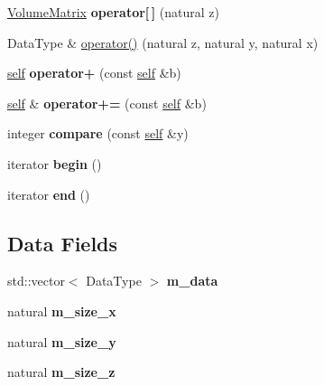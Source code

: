 \begin{DoxyCompactItemize}
\hyperlink{classez_1_1maths_1_1Volume_1_1VolumeMatrix}{Volume\+Matrix} {\bfseries operator\mbox{[}$\,$\mbox{]}} (natural z)
\item 
Data\+Type \& \hyperlink{classez_1_1maths_1_1Volume_af6447dfa426fd0fd36ab680f72b9475f}{operator()} (natural z, natural y, natural x)
\item 
\mbox{\label{classez_1_1maths_1_1Volume_a1d19bde6c9233344a36d4996171fb55d}} 
\hyperlink{classez_1_1maths_1_1Volume}{self} {\bfseries operator+} (const \hyperlink{classez_1_1maths_1_1Volume}{self} \&b)
\item 
\mbox{\label{classez_1_1maths_1_1Volume_ae9fadcb146b7c5415027eacd500bfc19}} 
\hyperlink{classez_1_1maths_1_1Volume}{self} \& {\bfseries operator+=} (const \hyperlink{classez_1_1maths_1_1Volume}{self} \&b)
\item 
\mbox{\label{classez_1_1maths_1_1Volume_a2f67756dd7296de1b7e0935355919c82}} 
integer {\bfseries compare} (const \hyperlink{classez_1_1maths_1_1Volume}{self} \&y)
\item 
\mbox{\label{classez_1_1maths_1_1Volume_af548d35f626f20ede1d4e8932def2c4b}} 
iterator {\bfseries begin} ()
\item 
\mbox{\label{classez_1_1maths_1_1Volume_a0ce9feec1c16966fd546618a2172b0e4}} 
iterator {\bfseries end} ()
\end{DoxyCompactItemize}
\subsection*{Data Fields}
\begin{DoxyCompactItemize}
\item 
\mbox{\label{classez_1_1maths_1_1Volume_a2de796352f8547618eab69885517da39}} 
std\+::vector$<$ Data\+Type $>$ {\bfseries m\+\_\+data}
\item 
\mbox{\label{classez_1_1maths_1_1Volume_ad7312c0e6e9a3c76cc70d5244d3923a9}} 
natural {\bfseries m\+\_\+size\+\_\+x}
\item 
\mbox{\label{classez_1_1maths_1_1Volume_a21825ba3f4b18f99652546ee2cb06af1}} 
natural {\bfseries m\+\_\+size\+\_\+y}
\item 
\mbox{\label{classez_1_1maths_1_1Volume_ae0d7589c9d8f9202604ce69afe5928ad}} 
natural {\bfseries m\+\_\+size\+\_\+z}
\end{DoxyCompactItemize}
